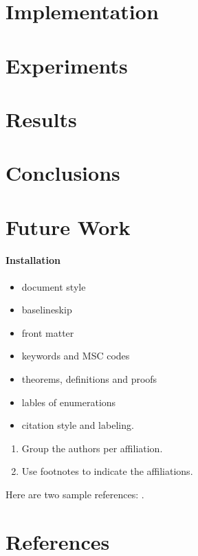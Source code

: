 \documentclass[review]{elsarticle}
\begin{document}
\section{Implementation}
\label{section:implementation}

\section{Experiments}
\label{section:experiments}

\section{Results}
\label{section:results}

\section{Conclusions}
\label{section:conclusions}

\section{Future Work}
\label{section:future-work}

\paragraph{Installation}

\begin{itemize}
\item document style
\item baselineskip
\item front matter
\item keywords and MSC codes
\item theorems, definitions and proofs
\item lables of enumerations
\item citation style and labeling.
\end{itemize}

\begin{enumerate}[(1)]
\item Group the authors per affiliation.
\item Use footnotes to indicate the affiliations.
\end{enumerate}

Here are two sample references: \cite{Feynman1963118,Dirac1953888}.

\section*{References}


\end{document}
